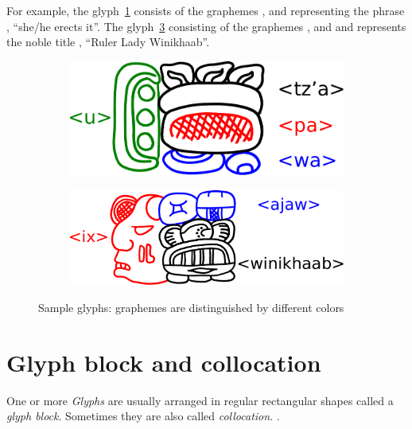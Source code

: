 \documentclass[../main.tex]{subfiles}
\begin{document}
For example, the glyph~\ref{fig:terminology-glyphs-utzapaw} consists of the 
graphemes ,  and  representing the phrase
, ``she/he erects it''.
The glyph~\ref{fig:terminology-glyphs-ixwinikhaabajaw} consisting of the 
graphemes ,  and 
and represents the noble title , ``Ruler Lady Winikhaab''.
\begin{figure}
    \centering
    \begin{subfigure}[b]{0.49\textwidth}
        \centering
        \includegraphics[height=\glyphblockheight]{img/glyphs-utzapaw}
        \caption{}
        \label{fig:terminology-glyphs-utzapaw}
    \end{subfigure}
    \hfill
    \begin{subfigure}[b]{0.49\textwidth}
        \centering
        \includegraphics[height=\glyphblockheight]{img/glyphs-ixwinikhaabajaw}
        \caption{}
        \label{fig:terminology-glyphs-ixwinikhaabajaw}
    \end{subfigure}
    \caption{Sample glyphs: graphemes are distinguished by different colors}
\end{figure}

\section{Glyph block and collocation}
One or more \emph{Glyphs} are usually arranged in regular rectangular shapes called a 
\emph{glyph block}.
Sometimes they are also called \emph{collocation}.
.
\end{document}
